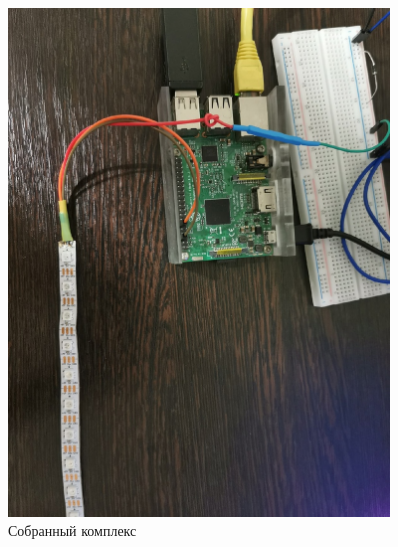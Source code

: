 \begin{figure}[H]
  \centering
  \includegraphics[angle=90, width=0.9\textwidth]{assets/images/practical/Полная схема.jpg}
  \caption{Собранный комплекс}
  \label{img:all__hard}
\end{figure}
